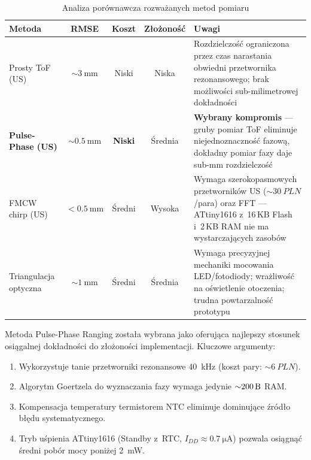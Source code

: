 \documentclass[a4paper,11pt]{article}
\begin{document}
\begin{table}[H]
    \centering
    \caption{Analiza porównawcza rozważanych metod pomiaru}
    \label{tab:porownanie_metod}
    \begin{tabularx}{\textwidth}{lcccX}
        \toprule
        \textbf{Metoda} & \textbf{RMSE} & \textbf{Koszt} & \textbf{Złożoność} & \textbf{Uwagi} \\
        \midrule
        Prosty ToF (US)
            & ${\sim}\SI{3}{\milli\metre}$
            & Niski
            & Niska
            & Rozdzielczość ograniczona przez czas narastania obwiedni przetwornika rezonansowego; brak możliwości sub-milimetrowej dokładności \\[6pt]
        \textbf{Pulse-Phase (US)}
            & ${\sim}\SI{0,5}{\milli\metre}$
            & \textbf{Niski}
            & Średnia
            & \textbf{Wybrany kompromis} --- gruby pomiar ToF eliminuje niejednoznaczność fazową, dokładny pomiar fazy daje sub-mm rozdzielczość \\[6pt]
        FMCW chirp (US)
            & ${<}\SI{0,5}{\milli\metre}$
            & Średni
            & Wysoka
            & Wymaga szerokopasmowych przetworników US (${\sim}\SI{30}{PLN}$/para) oraz FFT --- ATtiny1616 z~16\,KB Flash i~2\,KB RAM nie ma wystarczających zasobów \\[6pt]
        Triangulacja optyczna
            & ${\sim}\SI{1}{\milli\metre}$
            & Średni
            & Średnia
            & Wymaga precyzyjnej mechaniki mocowania LED/fotodiody; wrażliwość na oświetlenie otoczenia; trudna powtarzalność prototypu \\
        \bottomrule
    \end{tabularx}
\end{table}

Metoda Pulse-Phase Ranging została wybrana jako oferująca najlepszy stosunek
osiągalnej dokładności do złożoności implementacji. Kluczowe argumenty:

\begin{enumerate}[nosep]
    \item Wykorzystuje tanie przetworniki rezonansowe \SI{40}{\kilo\hertz} (koszt pary: ${\sim}\SI{6}{PLN}$).
    \item Algorytm Goertzela do wyznaczania fazy wymaga jedynie ${\sim}\SI{200}{\byte}$ RAM.
    \item Kompensacja temperatury termistorem NTC eliminuje dominujące źródło błędu systematycznego.
    \item Tryb uśpienia ATtiny1616 (Standby z~RTC, $I_{DD} \approx \SI{0,7}{\micro\ampere}$) pozwala osiągnąć średni pobór mocy poniżej \SI{2}{\milli\watt}.
\end{enumerate}
\end{document}
